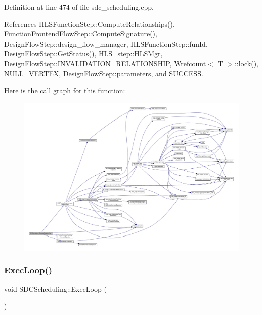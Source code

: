 Definition at line 474 of file sdc\+\_\+scheduling.\+cpp.



References H\+L\+S\+Function\+Step\+::\+Compute\+Relationships(), Function\+Frontend\+Flow\+Step\+::\+Compute\+Signature(), Design\+Flow\+Step\+::design\+\_\+flow\+\_\+manager, H\+L\+S\+Function\+Step\+::fun\+Id, Design\+Flow\+Step\+::\+Get\+Status(), H\+L\+S\+\_\+step\+::\+H\+L\+S\+Mgr, Design\+Flow\+Step\+::\+I\+N\+V\+A\+L\+I\+D\+A\+T\+I\+O\+N\+\_\+\+R\+E\+L\+A\+T\+I\+O\+N\+S\+H\+IP, Wrefcount$<$ T $>$\+::lock(), N\+U\+L\+L\+\_\+\+V\+E\+R\+T\+EX, Design\+Flow\+Step\+::parameters, and S\+U\+C\+C\+E\+SS.

Here is the call graph for this function\+:
\nopagebreak
\begin{figure}[H]
\begin{center}
\leavevmode
\includegraphics[width=350pt]{d4/dc5/classSDCScheduling_a28390f2bb68bc997c4827f5dbd240ca5_cgraph}
\end{center}
\end{figure}
\mbox{\label{classSDCScheduling_ae7d1f9a68a81ac64d667bc7e03b93679}} 
\subsubsection{\texorpdfstring{Exec\+Loop()}{ExecLoop()}}
{\footnotesize\ttfamily void S\+D\+C\+Scheduling\+::\+Exec\+Loop (\begin{DoxyParamCaption}{ }\end{DoxyParamCaption})\hspace{0.3cm}{\ttfamily [protected]}}



